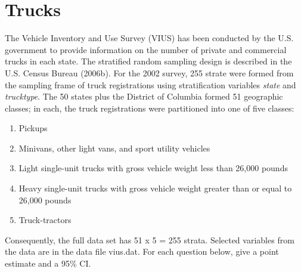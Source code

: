 \documentclass[]{article}
\begin{document}
\section{Trucks}

The Vehicle Inventory and Use Survey (VIUS) has been conducted by the U.S. government to provide information on the number of private and commercial trucks in each state. The stratified random sampling design is described in the U.S. Census Bureau (2006b). For the 2002 survey, 255 strate were formed from the sampling frame of truck registrations using stratification variables \textit{state} and \textit{trucktype}. The 50 states plus the District of Columbia formed 51 geographic classes; in each, the truck registrations were partitioned into one of five classes: 

\begin{enumerate}

\item Pickups
\item Minivans, other light vans, and sport utility vehicles
\item Light single-unit trucks with gross vehicle weight less than 26,000 pounds
\item Heavy single-unit trucks with gross vehicle weight greater than or equal to 26,000 pounds
\item Truck-tractors

\end{enumerate}

Consequently, the full data set has 51 x 5 = 255 strata. Selected variables from the data are in the data file vius.dat. For each question below, give a point estimate and a 95\% CI. 
\end{document}
